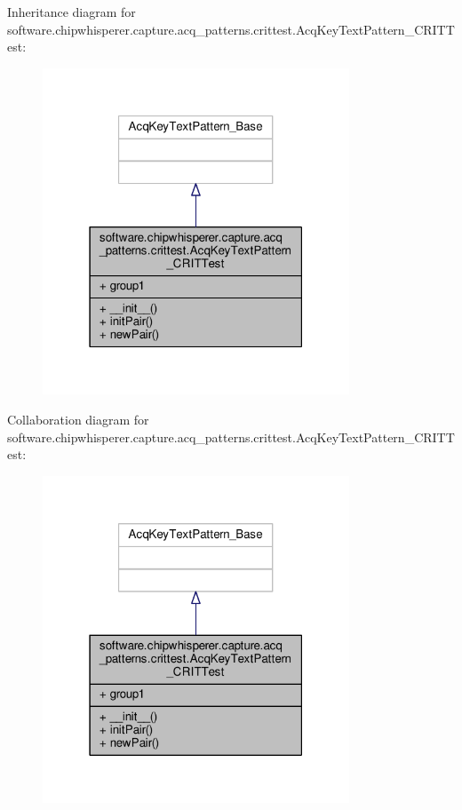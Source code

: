Inheritance diagram for software.\+chipwhisperer.\+capture.\+acq\+\_\+patterns.\+crittest.\+Acq\+Key\+Text\+Pattern\+\_\+\+C\+R\+I\+T\+Test\+:\nopagebreak
\begin{figure}[H]
\begin{center}
\leavevmode
\includegraphics[width=259pt]{d9/d75/classsoftware_1_1chipwhisperer_1_1capture_1_1acq__patterns_1_1crittest_1_1AcqKeyTextPattern__CRITTest__inherit__graph}
\end{center}
\end{figure}


Collaboration diagram for software.\+chipwhisperer.\+capture.\+acq\+\_\+patterns.\+crittest.\+Acq\+Key\+Text\+Pattern\+\_\+\+C\+R\+I\+T\+Test\+:\nopagebreak
\begin{figure}[H]
\begin{center}
\leavevmode
\includegraphics[width=259pt]{db/dce/classsoftware_1_1chipwhisperer_1_1capture_1_1acq__patterns_1_1crittest_1_1AcqKeyTextPattern__CRITTest__coll__graph}
\end{center}
\end{figure}


